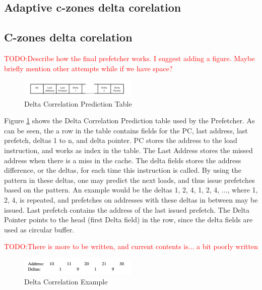 \documentclass[a4paper]{IEEEtran}
\newcommand\TODO[1]{\textcolor{red}{TODO:#1}}
\newcommand\todo[1]{\TODO{#1}}
\begin{document}
\subsection{Adaptive c-zones delta corelation}

\subsection{C-zones delta corelation}


\todo{Describe how the final prefetcher works. I suggest adding a figure. Maybe briefly mention other attempts while if we have space?}

\begin{figure}[h!]
  \centering
      \includegraphics[width=0.5\textwidth]{Figures/DCTable}
  \caption{Delta Correlation Prediction Table}
  \label{fig:DCTable}
\end{figure}

Figure \ref{fig:DCTable} shows the Delta Correlation Prediction table used by the Prefetcher.
As can be seen, the a row in the table contains fields for the PC, last address, last prefetch, deltas 1 to n, and delta pointer.
PC stores the address to the load instruction, and works as index in the table.
The Last Address stores the missed address when there is a miss in the cache.
The delta fields stores the address difference, or the deltas, for each time this instruction is called.
By using the pattern in these deltas, one may predict the next loads, and thus issue prefetches based on the pattern.
An example would be the deltas 1, 2, 4, 1, 2, 4, ..., where 1, 2, 4, is repeated, and prefetches on addresses with these deltas in between may be issued.
Last prefetch contains the address of the last issued prefetch.
The Delta Pointer points to the head (first Delta field) in the row, since the delta fields are used as circular buffer.

\todo{There is more to be written, and current contents is... a bit poorly written}

\begin{figure}[h!]
  \centering
      \includegraphics[width=0.5\textwidth]{Figures/DCExample}
  \caption{Delta Correlation Example}
  \label{fig:DCExample}
\end{figure}
\end{document}
